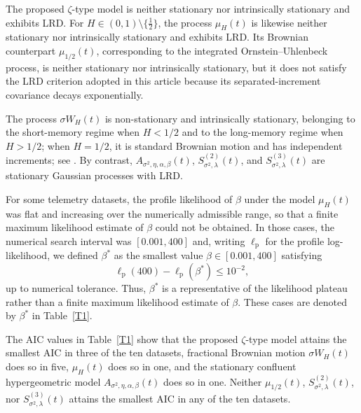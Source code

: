 \documentclass[preprint,12pt,authoryear]{elsarticle}
\begin{document}
The proposed \(\zeta\)-type model is neither stationary nor intrinsically
stationary and exhibits LRD. For
\(H\in(0,1)\setminus\{\frac12\}\), the process \(\mu_H(t)\) is likewise
neither stationary nor intrinsically stationary and exhibits LRD. Its
Brownian counterpart \(\mu_{1/2}(t)\), corresponding to the integrated
Ornstein--Uhlenbeck process, is neither stationary nor intrinsically
stationary, but it does not satisfy the LRD criterion adopted in this
article because its separated-increment covariance decays exponentially.

The process \(\sigma W_H(t)\) is non-stationary and intrinsically
stationary, belonging to the short-memory regime when \(H<1/2\) and to
the long-memory regime when \(H>1/2\); when \(H=1/2\), it is standard
Brownian motion and has independent increments; see
\cite{Gorostiza2015}. By contrast,
\(A_{\sigma^2,\eta,\alpha,\beta}(t)\),
\(S_{\sigma^2,\lambda}^{(2)}(t)\), and
\(S_{\sigma^2,\lambda}^{(3)}(t)\) are stationary Gaussian processes with
LRD.

For some telemetry datasets, the profile likelihood of \(\beta\) under
the model \(\mu_H(t)\) was flat and increasing over the numerically
admissible range, so that a finite maximum likelihood estimate of
\(\beta\) could not be obtained. In those cases, the numerical search
interval was \([0.001,400]\) and, writing \(\ell_{\mathrm p}\) for the
profile log-likelihood, we defined \(\beta^*\) as the smallest value
\(\beta\in[0.001,400]\) satisfying
\[
\ell_{\mathrm p}(400)-\ell_{\mathrm p}(\beta^*)\leq 10^{-2},
\]
up to numerical tolerance. Thus, \(\beta^*\) is a representative of the
likelihood plateau rather than a finite maximum likelihood estimate of
\(\beta\). These cases are denoted by \(\beta^*\) in Table~\ref{T1}.

The AIC values in Table~\ref{T1} show that the proposed
\(\zeta\)-type model attains the smallest AIC in three of the ten
datasets, fractional Brownian motion \(\sigma W_H(t)\) does so in five,
\(\mu_H(t)\) does so in one, and the stationary confluent hypergeometric
model \(A_{\sigma^2,\eta,\alpha,\beta}(t)\) does so in one. Neither
\(\mu_{1/2}(t)\), \(S_{\sigma^2,\lambda}^{(2)}(t)\), nor
\(S_{\sigma^2,\lambda}^{(3)}(t)\) attains the smallest AIC in any
of the ten datasets.
\end{document}

